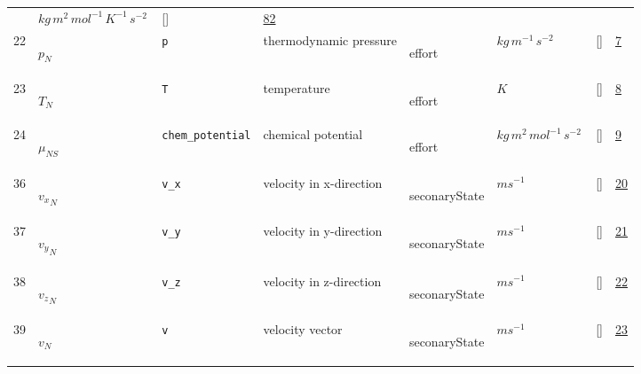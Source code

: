 \begin{longtable}{|p{1cm}|p{3cm}|p{3cm}|p{7cm}|p{3.0cm}|p{3cm}|p{2cm}|p{1cm}|}
             & $ kg \,m^{2} \,mol^{-1} \,K^{-1} \,s^{-2} \, $
             & []
             & \hyperlink{"e:82"}{ 82 }
                 \\
    22
             & \hypertarget{"v:22"}{ $ {p}_{N} $}
             & \verb|p|
             & thermodynamic pressure
             & \begin{lay}effort \end{lay}
             & $ kg \,m^{-1} \,s^{-2} \, $
             & []
             & \hyperlink{"e:7"}{ 7 }
                 \\
    23
             & \hypertarget{"v:23"}{ $ {T}_{N} $}
             & \verb|T|
             & temperature
             & \begin{lay}effort \end{lay}
             & $ K \, $
             & []
             & \hyperlink{"e:8"}{ 8 }
                 \\
    24
             & \hypertarget{"v:24"}{ $ {\mu}_{{N S}} $}
             & \verb|chem_potential|
             & chemical potential
             & \begin{lay}effort \end{lay}
             & $ kg \,m^{2} \,mol^{-1} \,s^{-2} \, $
             & []
             & \hyperlink{"e:9"}{ 9 }
                 \\
    36
             & \hypertarget{"v:36"}{ $ {v_x}_{N} $}
             & \verb|v_x|
             & velocity in x-direction
             & \begin{lay}seconaryState \end{lay}
             & $ m s^{-1} \, $
             & []
             & \hyperlink{"e:20"}{ 20 }
                 \\
    37
             & \hypertarget{"v:37"}{ $ {v_y}_{N} $}
             & \verb|v_y|
             & velocity in y-direction
             & \begin{lay}seconaryState \end{lay}
             & $ m s^{-1} \, $
             & []
             & \hyperlink{"e:21"}{ 21 }
                 \\
    38
             & \hypertarget{"v:38"}{ $ {v_z}_{N} $}
             & \verb|v_z|
             & velocity in z-direction
             & \begin{lay}seconaryState \end{lay}
             & $ m s^{-1} \, $
             & []
             & \hyperlink{"e:22"}{ 22 }
                 \\
    39
             & \hypertarget{"v:39"}{ $ {v}_{N} $}
             & \verb|v|
             & velocity vector
             & \begin{lay}seconaryState \end{lay}
             & $ m s^{-1} \, $
             & []
             & \hyperlink{"e:23"}{ 23 }
                 \\
    \end{longtable}